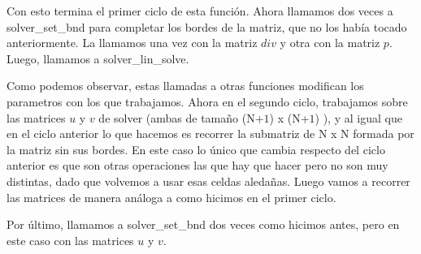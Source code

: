 \par Con esto termina el primer ciclo de esta función. Ahora llamamos dos veces a solver\_set\_bnd para completar los bordes de la matriz, que no los había tocado anteriormente. La llamamos una vez con la matriz $div$ y otra con la matriz $p$. Luego, llamamos a solver\_lin\_solve.\newline

\par Como podemos observar, estas llamadas a otras funciones modifican los parametros con los que trabajamos. Ahora en el segundo ciclo, trabajamos sobre las matrices $u$ y $v$ de solver (ambas de tamaño (N+$1$) x (N+$1$) ), y al igual que en el ciclo anterior lo que hacemos es recorrer la submatriz de N x N formada por la matriz sin sus bordes. En este caso lo único que cambia respecto del ciclo anterior es que son otras operaciones las que hay que hacer pero no son muy distintas, dado que volvemos a usar esas celdas aledañas. Luego vamos a recorrer las matrices de manera análoga a como hicimos en el primer ciclo.\newline

\par Por último, llamamos a solver\_set\_bnd dos veces como hicimos antes, pero en este caso con las matrices $u$ y $v$.\newline
